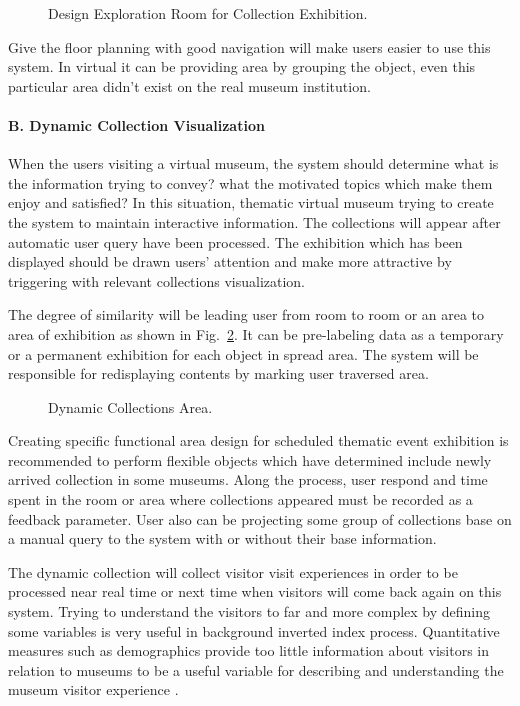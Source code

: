 \begin{figure}[ht]
	\caption{Design Exploration Room for Collection Exhibition.}\label{fig:designExplorationRoom}
\end{figure}

Give the floor planning with good navigation will make users easier to use this system. In virtual it can be providing area by grouping the object, even this particular area didn’t exist on the real museum institution.

\paragraph{B. Dynamic Collection Visualization}
When the users visiting a virtual museum, the system should determine what is the information trying to convey? what the motivated topics which make them enjoy and satisfied? In this situation, thematic virtual museum trying to create the system to maintain interactive information. The collections will appear after automatic user query have been processed. The exhibition which has been displayed should be drawn users’ attention and make more attractive by triggering with relevant collections visualization.

The degree of similarity will be leading user from room to room or an area to area of exhibition as shown in Fig.~\cref{fig:dynamicCollectionsArea}. It can be pre-labeling data as a temporary or a permanent exhibition for each object in spread area. The system will be responsible for redisplaying contents by marking user traversed area.

\begin{figure}[ht]
	\caption{Dynamic Collections Area.}\label{fig:dynamicCollectionsArea}
\end{figure}

Creating specific functional area design for scheduled thematic event exhibition is recommended to perform flexible objects which have determined include newly arrived collection in some museums. Along the process, user respond and time spent in the room or area where collections appeared must be recorded as a feedback parameter. User also can be projecting some group of collections base on a manual query to the system with or without their base information.

The dynamic collection will collect visitor visit experiences in order to be processed near real time or next time when visitors will come back again on this system. Trying to understand the visitors to far and more complex by defining some variables is very useful in background inverted index process. Quantitative measures such as demographics provide too little information about visitors in relation to museums to be a useful variable for describing and understanding the museum visitor experience \cite{Falk}.

